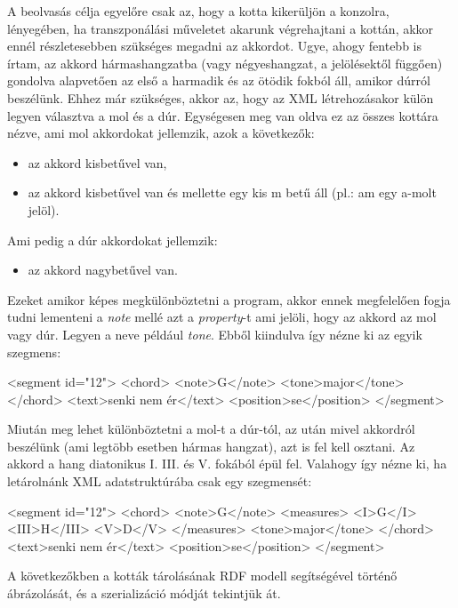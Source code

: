 A beolvasás célja egyelőre csak az, hogy a kotta kikerüljön a konzolra, lényegében, ha transzponálási műveletet akarunk végrehajtani a kottán, akkor ennél részletesebben szükséges megadni az akkordot. Ugye, ahogy fentebb is írtam, az akkord hármashangzatba (vagy négyeshangzat, a jelölésektől függően) gondolva alapvetően az első a harmadik és az ötödik fokból áll, amikor dúrról beszélünk. Ehhez már szükséges, akkor az, hogy az XML létrehozásakor külön legyen választva a mol és a dúr. Egységesen meg van oldva ez az összes kottára nézve, ami mol akkordokat jellemzik, azok a következők:
\begin{itemize}
	\item az akkord kisbetűvel van,
	\item az akkord kisbetűvel van és mellette egy kis m betű áll (pl.: am egy a-molt jelöl).
\end{itemize}
Ami pedig a dúr akkordokat jellemzik:
\begin{itemize}
	\item az akkord nagybetűvel van.
\end{itemize}
Ezeket amikor képes megkülönböztetni a program, akkor ennek megfelelően fogja tudni lementeni a \textit{note} mellé azt a \textit{property}-t ami jelöli, hogy az akkord az mol vagy dúr. Legyen a neve például \textit{tone}. Ebből kiindulva így nézne ki az egyik szegmens:
\begin{xml}
<segment id="12">
   <chord>
      <note>G</note>
      <tone>major</tone>
   </chord>
   <text>senki nem ér</text>
   <position>se</position>
</segment>
\end{xml}

Miután meg lehet különböztetni a mol-t a dúr-tól, az után mivel akkordról beszélünk (ami legtöbb esetben hármas hangzat), azt is fel kell osztani. Az akkord a hang diatonikus I. III. és V. fokából épül fel. Valahogy így nézne ki, ha letárolnánk XML adatstruktúrába csak egy szegmensét:
\begin{xml}
<segment id="12">
   <chord>
      <note>G</note>
      <measures>
         <I>G</I>
         <III>H</III>
         <V>D</V>
      </measures>
      <tone>major</tone>
   </chord>
   <text>senki nem ér</text>
   <position>se</position>
</segment>
\end{xml}


A következőkben a kották tárolásának RDF modell segítségével történő ábrázolását, és a szerializáció módját tekintjük át.

